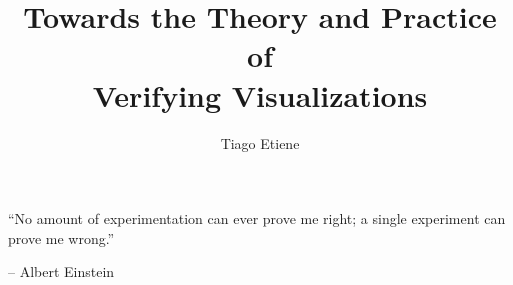 \documentclass[11pt,Chicago]{uuthesis}
\title{Towards the Theory and Practice of \protect\\ Verifying Visualizations}
\author{Tiago Etiene}
\begin{document}
\frontmatterformat
\titlepage
\copyrightpage
\committeeapproval
\readingapproval
{}
\dedicationpage
\begin{epigraph}
``No amount of experimentation can ever prove me right; a single experiment can prove me wrong.''
\begin{flushright} -- Albert Einstein \par\end{flushright}
\end{epigraph}
\setcounter{tocdepth}{4}    %
\tableofcontents
\listoffigures
\listoftables
%
%
\maintext       %







%
%

%
%

%


\end{document}

